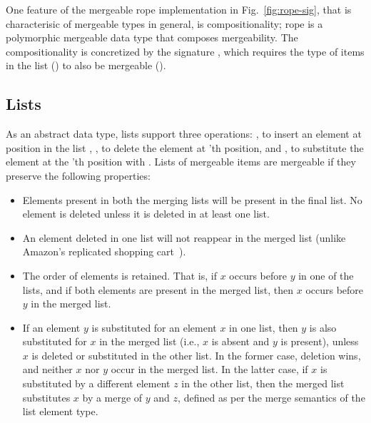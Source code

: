 One feature of the mergeable rope implementation in
Fig.~\ref{fig:rope-sig}, that is characterisic of mergeable types in
general, is compositionality; rope is a polymorphic mergeable data
type that composes mergeability. The compositionality is concretized
by the  signature , which requires the type of items in the
list () to also be mergeable ().

\subsection{Lists}



As an abstract data type, lists support three
operations: , to insert an element  at position
 in the list , , to delete the element at
'th position, and , to substitute the element at
the 'th position with .  Lists of mergeable items are
mergeable if they preserve the following properties:
\begin{itemize}
  \item Elements present in both the merging lists will be present in
  the final list. No element is deleted unless it is deleted in at
  least one list.
  \item An element deleted in one list will not reappear in the merged
  list (unlike Amazon's replicated shopping cart~\cite{dynamo}).
  \item The order of elements is retained. That is, if $x$ occurs
  before $y$ in one of the lists, and if both elements are present in
  the merged list, then $x$ occurs before $y$ in the merged list.
\item If an element $y$ is substituted for an element $x$ in one list,
  then $y$ is also substituted for $x$ in the merged list (i.e., $x$
  is absent and $y$ is present), unless $x$ is deleted or substituted
  in the other list. In the former case, deletion wins, and neither
  $x$ nor $y$ occur in the merged list. In the latter case, if $x$ is
  substituted by a different element $z$ in the other list, then the
  merged list substitutes $x$ by a merge of $y$ and $z$, defined as
  per the merge semantics of the list element type.
\end{itemize}

